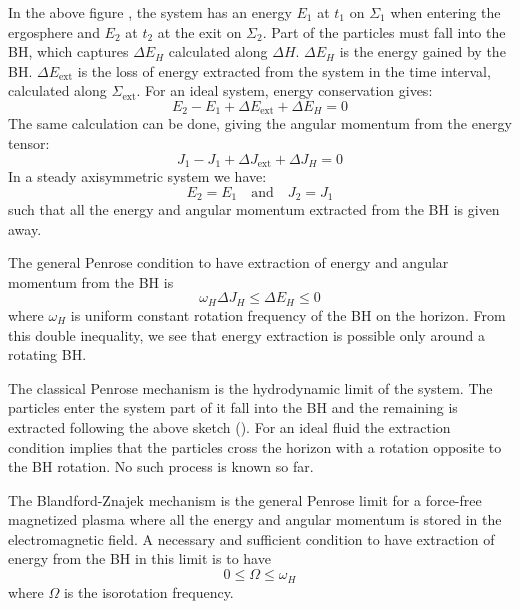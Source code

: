 \documentclass[10pt,a4paper,english]{article}
\begin{document}
In the above figure , the system has an energy $E_1$ at
$t_1$ on $\Sigma_1$ when entering the ergosphere and $E_2$ at $t_2$ at
the exit on $\Sigma_2$. Part of the particles must fall into the BH,
which captures $\Delta E_H$ calculated along $\Delta H$. $\Delta E_H$
is the energy gained by the BH. $\Delta E_\mathrm{ext}$ is the loss of
energy extracted from the system in the time interval, calculated
along $\Sigma_\mathrm{ext}$. For an ideal system, energy conservation
gives:
\begin{equation}
  E_2 - E_1 + \Delta E_\mathrm{ext} + \Delta E_H = 0
\end{equation}
The same calculation can be done, giving the angular momentum from the
energy tensor:
\begin{equation}
  J_1 - J_1 + \Delta J_\mathrm{ext} + \Delta J_H = 0
\end{equation}
In a steady axisymmetric system we have:
\begin{equation}
  E_2 = E_1 \quad \textrm{and} \quad J_2 = J_1
\end{equation}
such that all the energy and angular momentum extracted from the BH is
given away.

The general Penrose condition to have extraction of energy and angular
momentum from the BH is
\begin{equation}
  \omega_H \Delta J_H \leq \Delta E_H \leq 0
\end{equation}
where $\omega_H$ is uniform constant rotation frequency of the BH on
the horizon. From this double inequality, we see that energy
extraction is possible only around a rotating BH.  

The classical Penrose mechanism is the hydrodynamic limit of the
system. The particles enter the system part of it fall into the BH and
the remaining is extracted following the above sketch
(). For an ideal fluid the extraction condition implies
that the particles cross the horizon with a rotation opposite to the
BH rotation. No such process is known so far.

The Blandford-Znajek mechanism is the general Penrose limit for a
force-free magnetized plasma where all the energy and angular momentum
is stored in the electromagnetic field. A necessary and sufficient
condition to have extraction of energy from the BH in this limit is to
have
\begin{equation}
  0 \leq \Omega \leq \omega_H
\end{equation}
where $\Omega$ is the isorotation frequency.
\end{document}
